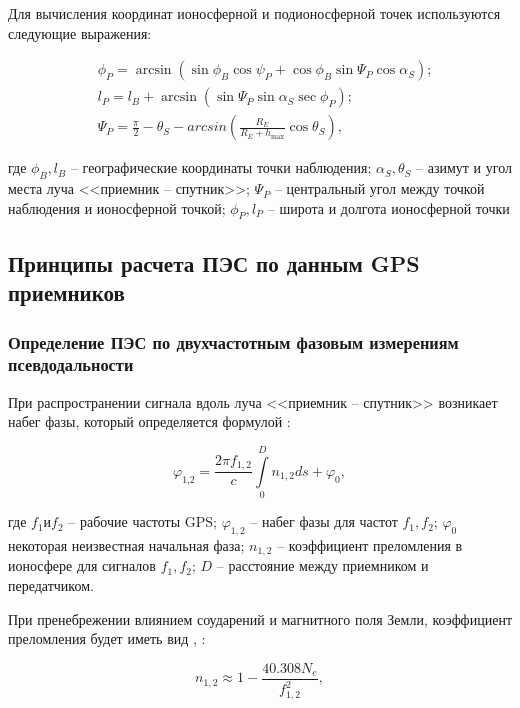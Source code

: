 \documentclass[a4paper]{article}
\begin{document}
Для вычисления координат ионосферной и подионосферной точек используются следующие выражения:

\begin{equation}
\begin{aligned}
	&\phi_P = \arcsin{\left(\sin{\phi_B}\cos{\psi_P} + \cos{\phi_B}\sin{\Psi_P}\cos{\alpha_S}\right)};\\
	&l_P = l_B + \arcsin{\left(\sin{\Psi_P}\sin{\alpha_S}\sec{\phi_P}\right)};\\
	&\Psi_P = \frac{\pi}{2} - \theta_S - arcsin{\left(\frac{R_E}{R_E + h_\text{max}}\cos{\theta_S}\right)},
\end{aligned}
\end{equation}

где $\phi_B, l_B$ -- географические координаты точки наблюдения; $\alpha_S, \theta_S$ -- азимут и угол места луча <<приемник -- спутник>>; $\Psi_P$ -- центральный угол между точкой наблюдения и ионосферной точкой; $\phi_P, l_P$ -- широта и долгота ионосферной точки 

\newpage
\subsection{Принципы расчета ПЭС по данным GPS приемников}
\subsubsection{Определение ПЭС по двухчастотным фазовым измерениям псевдодальности}
При распространении сигнала вдоль луча <<приемник -- спутник>> возникает набег фазы, который определяется формулой \cite{devis}:

\begin{equation}
\varphi_\text{1,2} = \frac{2\pi f_{1,2}}{c} \int\limits_{0}^{D}n_{1,2}ds + \varphi_0,
\end{equation}

где $f_1 \text{и}  f_2$ -- рабочие частоты GPS; $\varphi_{1,2}$ -- набег фазы для частот $f_1, f_2$; $\varphi_0$ некоторая неизвестная начальная фаза; $n_{1,2}$ -- коэффициент преломления в ионосфере для сигналов $f_1, f_2$; $D$ -- расстояние между приемником и передатчиком.

При пренебрежении влиянием соударений и магнитного поля Земли, коэффициент преломления будет иметь вид \cite{devis}, \cite{ratcliff}:

\begin{equation}
\label{n_equ}
n_{1,2} \approx 1 - \frac{40.308N_e}{f_{1,2}^2},
\end{equation}
\end{document}
